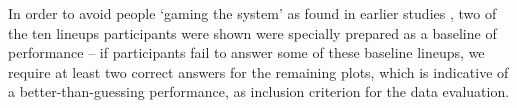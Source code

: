  In order to avoid people `gaming the system' as found in earlier studies \cite{heer:2010, kosara:2010}, two of the ten lineups participants were shown were specially prepared as a baseline of performance -- if participants fail to answer some of these baseline lineups, we require at least two correct answers for the remaining plots, which is indicative of a better-than-guessing performance, as inclusion criterion for the data evaluation. 

